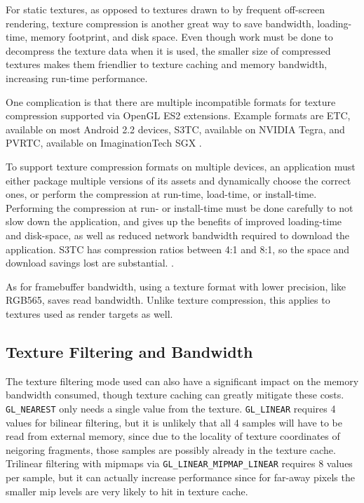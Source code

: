 For static textures, as opposed to textures drawn to by frequent off-screen
rendering, texture compression is another great way to save bandwidth,
loading-time, memory footprint, and disk space.  Even though work must be done
to decompress the texture data when it is used, the smaller size of compressed
textures makes them friendlier to texture caching and memory bandwidth,
increasing run-time performance. 

One complication is that there are multiple incompatible formats for texture
compression supported via OpenGL ES2
 extensions.  Example formats are ETC,
available on most Android 2.2 devices, S3TC, available on NVIDIA Tegra, and
PVRTC,
 available on ImaginationTech SGX \cite{Motorola11}.

To support texture compression formats on multiple devices, an
application must either package multiple versions of its assets and dynamically
choose the correct ones, or perform the compression at run-time, load-time, or
install-time.  Performing the compression at run- or install-time must be done
carefully to not slow down the application, and gives up the benefits of
improved loading-time and disk-space, as well as reduced network bandwidth
required to download the application.  S3TC has compression ratios between 4:1
and 8:1, so the space and download savings lost are substantial.
\cite{Domine00}.

As for framebuffer bandwidth, using a texture format with lower precision, like
RGB565, saves read bandwidth.  Unlike texture compression, this applies to
textures used as render targets as well.

\subsection{Texture Filtering and Bandwidth}
The texture filtering mode used can also have a significant impact on the
memory bandwidth consumed, though texture caching can greatly mitigate these
costs.  \texttt{GL\_NEAREST} only needs a single value from the texture.
\texttt{GL\_LINEAR} requires 4 values for bilinear filtering, but it is
unlikely that all 4 samples will have to be read from external memory, since
due to the locality of texture coordinates of neigoring fragments, those
samples are possibly already in the texture cache.  Trilinear filtering with
mipmaps via \texttt{GL\_LINEAR\_MIPMAP\_LINEAR} requires 8 values per sample,
but it can actually increase performance since for far-away pixels the smaller
mip levels are very likely to hit in texture cache.

